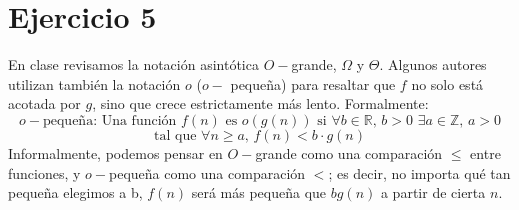 \documentclass[12pt]{article}
\begin{document}
\section*{Ejercicio 5}
En clase revisamos la notación asintótica $O-$grande, $\Omega$ y $\Theta$. Algunos autores utilizan también la notación $o$ ($o-$ pequeña) para resaltar que $f$ no solo está acotada por $g$, sino que crece estrictamente más lento. Formalmente:
\[
    o-\text{pequeña: Una función } f(n) \text{ es } o(g(n)) \text{ si } \forall b \in \mathbb{R}, \, b>0 \,\, \exists a \in \mathbb{Z},\, a>0
\]
\[
    \text{tal que } \forall n \geq a, \, f(n) < b \cdot g(n)
\]
Informalmente, podemos pensar en $O-$grande como una comparación $\leq$ entre funciones, y $o-$pequeña como una comparación $<$; es decir, no importa qué tan pequeña elegimos a b, $f(n)$ será más pequeña que $bg(n)$ a partir de cierta $n$.
\end{document}
